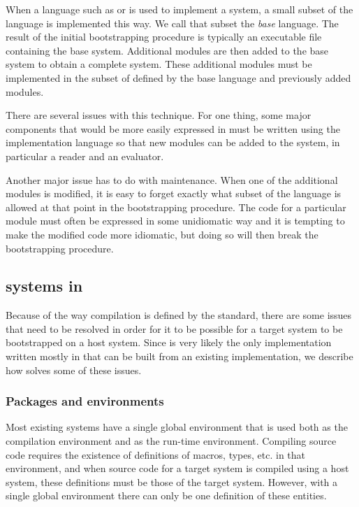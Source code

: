 When a language such as \clanguage{} or \cplusplus{} is used to
implement a \commonlisp{} system, a small subset of the \commonlisp{}
language is implemented this way.  We call that subset the \emph{base}
language.  The result of the initial bootstrapping procedure is
typically an executable file containing the base system.  Additional
modules are then added to the base system to obtain a complete
\commonlisp{} system.  These additional modules must be implemented in
the subset of \commonlisp{} defined by the base language and
previously added modules.

There are several issues with this technique.  For one thing, some
major components that would be more easily expressed in \commonlisp{}
must be written using the implementation language so that new modules
can be added to the system, in particular a reader and an evaluator.

Another major issue has to do with maintenance.  When one of the
additional modules is modified, it is easy to forget exactly what
subset of the \commonlisp{} language is allowed at that point in the
bootstrapping procedure.  The code for a particular module must often be
expressed in some unidiomatic way and it is tempting to make the
modified code more idiomatic, but doing so will then break the
bootstrapping procedure.

\subsection{\commonlisp{} systems in \commonlisp{}}
\label{sec-cl-in-cl}

Because of the way compilation is defined by the \commonlisp{}
standard, there are some issues that need to be resolved in order for
it to be possible for a target \commonlisp{} system to be bootstrapped
on a host \commonlisp{} system.  Since \sbcl{} is very likely the only
\commonlisp{} implementation written mostly in \commonlisp{} that can
be built from an existing \commonlisp{} implementation, we describe
how \sbcl{} solves some of these issues.

\subsubsection{Packages and environments}

Most existing \commonlisp{} systems have a single global environment
that is used both as the compilation environment and as the run-time
environment.  Compiling \commonlisp{} source code requires the
existence of definitions of macros, types, etc. in that environment,
and when source code for a target \commonlisp{} system is compiled
using a host \commonlisp{} system, these definitions must be those of
the target system.  However, with a single global environment there
can only be one definition of these entities.

